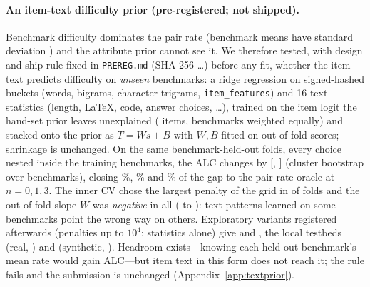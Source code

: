 \documentclass{article}
\begin{document}
\paragraph{An item-text difficulty prior (pre-registered; not shipped).} Benchmark difficulty dominates the pair rate (benchmark means have standard deviation \FitBenchRateSd) and the attribute prior cannot see it. We therefore tested, with design and ship rule fixed in \texttt{PREREG.md} (SHA-256 \texttt{\TpPreregSha}\dots) before any fit, whether the item text predicts difficulty on \emph{unseen} benchmarks: a ridge regression on \TpBits{} signed-hashed buckets (words, bigrams, character trigrams, \texttt{item\_features}) and 16 text statistics (length, \LaTeX, code, answer choices, \dots), trained on the item logit the hand-set prior leaves unexplained (\TpNTargetItems{} items, benchmarks weighted equally) and stacked onto the prior as $T=Ws+B$ with $W,B$ fitted on out-of-fold scores; shrinkage is unchanged. On the same benchmark-held-out folds, every choice nested inside the training benchmarks, the ALC changes by \TpDiffAlcMean{} [\TpDiffAlcLo, \TpDiffAlcHi] (cluster bootstrap over \TpNClusters{} benchmarks), closing \TpGapZero\%, \TpGapOne\% and \TpGapThree\% of the gap to the pair-rate oracle at $n=0,1,3$. The inner CV chose the largest penalty of the grid in \TpNFoldsAlphaMax{} of \TpNFolds{} folds and the out-of-fold slope $W$ was \emph{negative} in all \TpNFoldsNegW{} (\TpFoldWMin{} to \TpFoldWMax): text patterns learned on some benchmarks point the wrong way on others. Exploratory variants registered afterwards (penalties up to $10^4$; statistics alone) give \TpEOneDiffMean{} and \TpETwoDiffMean, the local testbeds \TpRPairFullMean{} (real, \TpRPairFullSig) and \TpSPairFullMean{} (synthetic, \TpSPairFullSig). Headroom exists---knowing each held-out benchmark's mean rate would gain \TpDiffBenchOracleMean{} ALC---but item text in this form does not reach it; the rule fails and the submission is unchanged (Appendix~\ref{app:textprior}).
\end{document}
